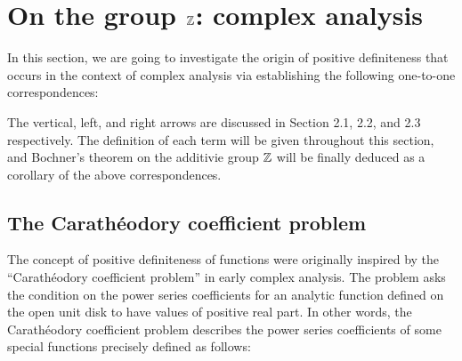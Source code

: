 \documentclass[12pt]{article}
\begin{document}
\newpage
\section{On the group $\mathbb{Z}$: complex analysis}



In this section, we are going to investigate the origin of positive definiteness that occurs in the context of complex analysis via establishing the following one-to-one correspondences:
\begin{figure}[h]
\end{figure}

The vertical, left, and right arrows are discussed in Section 2.1, 2.2, and 2.3 respectively.
The definition of each term will be given throughout this section, and Bochner's theorem on the additivie group $\mathbb{Z}$ will be finally deduced as a corollary of the above correspondences.

\subsection{The Carath\'eodory coefficient problem}

The concept of positive definiteness of functions were originally inspired by the ``Carath\'eodory coefficient problem'' in early complex analysis.
The problem asks the condition on the power series coefficients for an analytic function defined on the open unit disk to have values of positive real part.
In other words, the Carath\'eodory coefficient problem describes the power series coefficients of some special functions precisely defined as follows:
\end{document}
